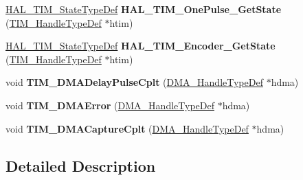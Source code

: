 \begin{DoxyCompactItemize}
\item 
\hypertarget{group___t_i_m___exported___functions___group10_gab66fcfc1ee00512f50ef56f4397a0e9f}{\hyperlink{group___t_i_m___exported___types_gae0994cf5970e56ca4903e9151f40010c}{H\-A\-L\-\_\-\-T\-I\-M\-\_\-\-State\-Type\-Def} {\bfseries H\-A\-L\-\_\-\-T\-I\-M\-\_\-\-One\-Pulse\-\_\-\-Get\-State} (\hyperlink{struct_t_i_m___handle_type_def}{T\-I\-M\-\_\-\-Handle\-Type\-Def} $\ast$htim)}\label{group___t_i_m___exported___functions___group10_gab66fcfc1ee00512f50ef56f4397a0e9f}

\item 
\hypertarget{group___t_i_m___exported___functions___group10_ga1925971e419b85db7fed57919ba765ef}{\hyperlink{group___t_i_m___exported___types_gae0994cf5970e56ca4903e9151f40010c}{H\-A\-L\-\_\-\-T\-I\-M\-\_\-\-State\-Type\-Def} {\bfseries H\-A\-L\-\_\-\-T\-I\-M\-\_\-\-Encoder\-\_\-\-Get\-State} (\hyperlink{struct_t_i_m___handle_type_def}{T\-I\-M\-\_\-\-Handle\-Type\-Def} $\ast$htim)}\label{group___t_i_m___exported___functions___group10_ga1925971e419b85db7fed57919ba765ef}

\item 
\hypertarget{group___t_i_m___exported___functions___group10_ga78edd2f05a873d68690d8658aa427ccf}{void {\bfseries T\-I\-M\-\_\-\-D\-M\-A\-Delay\-Pulse\-Cplt} (\hyperlink{group___d_m_a___exported___types_ga92b907d56a9c29b93d46782a7a04f91e}{D\-M\-A\-\_\-\-Handle\-Type\-Def} $\ast$hdma)}\label{group___t_i_m___exported___functions___group10_ga78edd2f05a873d68690d8658aa427ccf}

\item 
\hypertarget{group___t_i_m___exported___functions___group10_gaa112bee5279feee040c1ea9e283f7378}{void {\bfseries T\-I\-M\-\_\-\-D\-M\-A\-Error} (\hyperlink{group___d_m_a___exported___types_ga92b907d56a9c29b93d46782a7a04f91e}{D\-M\-A\-\_\-\-Handle\-Type\-Def} $\ast$hdma)}\label{group___t_i_m___exported___functions___group10_gaa112bee5279feee040c1ea9e283f7378}

\item 
\hypertarget{group___t_i_m___exported___functions___group10_ga60b9c315720fddb3db32299f05f7d712}{void {\bfseries T\-I\-M\-\_\-\-D\-M\-A\-Capture\-Cplt} (\hyperlink{group___d_m_a___exported___types_ga92b907d56a9c29b93d46782a7a04f91e}{D\-M\-A\-\_\-\-Handle\-Type\-Def} $\ast$hdma)}\label{group___t_i_m___exported___functions___group10_ga60b9c315720fddb3db32299f05f7d712}

\end{DoxyCompactItemize}


\subsection{Detailed Description}
